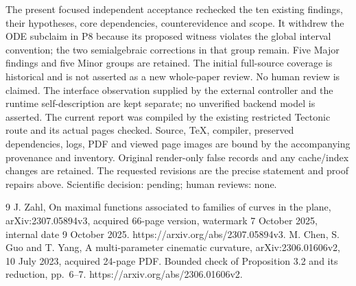 \documentclass[10pt]{article}
\begin{document}
The present focused independent acceptance rechecked the ten existing findings, their hypotheses, core dependencies, counterevidence and scope. It withdrew the ODE subclaim in P8 because its proposed witness violates the global interval convention; the two semialgebraic corrections in that group remain. Five Major findings and five Minor groups are retained. The initial full-source coverage is historical and is not asserted as a new whole-paper review. No human review is claimed. The interface observation supplied by the external controller and the runtime self-description are kept separate; no unverified backend model is asserted. The current report was compiled by the existing restricted Tectonic route and its actual pages checked. Source, TeX, compiler, preserved dependencies, logs, PDF and viewed page images are bound by the accompanying provenance and inventory. Original render-only false records and any cache/index changes are retained. The requested revisions are the precise statement and proof repairs above. Scientific decision: pending; human reviews: none.\par
9 J. Zahl, On maximal functions associated to families of curves in the plane, arXiv:2307.05894v3, acquired 66-page version, watermark 7 October 2025, internal date 9 October 2025. https://arxiv.org/abs/2307.05894v3. M. Chen, S. Guo and T. Yang, A multi-parameter cinematic curvature, arXiv:2306.01606v2, 10 July 2023, acquired 24-page PDF. Bounded check of Proposition 3.2 and its reduction, pp. 6–7. https://arxiv.org/abs/2306.01606v2.\par
\end{document}

